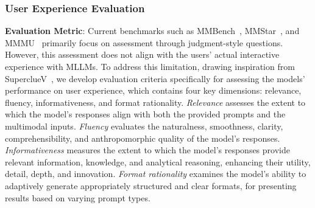 \subsubsection{User Experience Evaluation}\label{sec:human_evaluation}
\textbf{Evaluation Metric}:
Current benchmarks such as MMBench~\cite{liu2025mmbench}, MMStar~\cite{chen2024we}, and MMMU~\cite{yue2023mmmu} primarily focus on assessment through judgment-style questions. However, this assessment does not align with the users' actual interactive experience with MLLMs. To address this limitation, drawing inspiration from SuperclueV~\cite{supercluev}, we develop evaluation criteria specifically for assessing the models' performance on user experience, which contains four key dimensions: relevance, fluency, informativeness, and format rationality. \textit{Relevance} assesses the extent to which the model's responses align with both the provided prompts and the multimodal inputs.
\textit{Fluency} evaluates the naturalness, smoothness, clarity, comprehensibility, and anthropomorphic quality of the model's responses.
\textit{Informativeness} measures the extent to which the model's responses provide relevant information, knowledge, and analytical reasoning, enhancing their utility, detail, depth, and innovation.
\textit{Format rationality} examines the model's ability to adaptively generate appropriately structured and clear formats, for presenting results based on varying prompt types.





